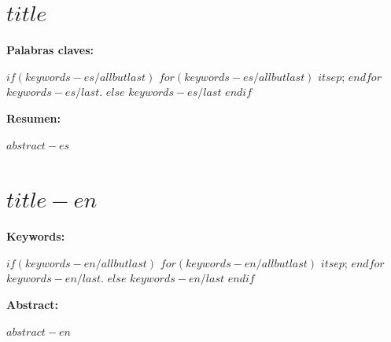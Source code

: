 \section*{$title$}

\textbf{Palabras claves:}

$if(keywords-es/allbutlast)$
$for(keywords-es/allbutlast)$
$it$$sep$;
$endfor$
$keywords-es/last$.
$else$
$keywords-es/last$
$endif$


\textbf{Resumen:}

$abstract-es$

\newpage

\section*{$title-en$}

\textbf{Keywords:}

$if(keywords-en/allbutlast)$
$for(keywords-en/allbutlast)$
$it$$sep$;
$endfor$
$keywords-en/last$.
$else$
$keywords-en/last$
$endif$

\textbf{Abstract:}

$abstract-en$

\newpage
